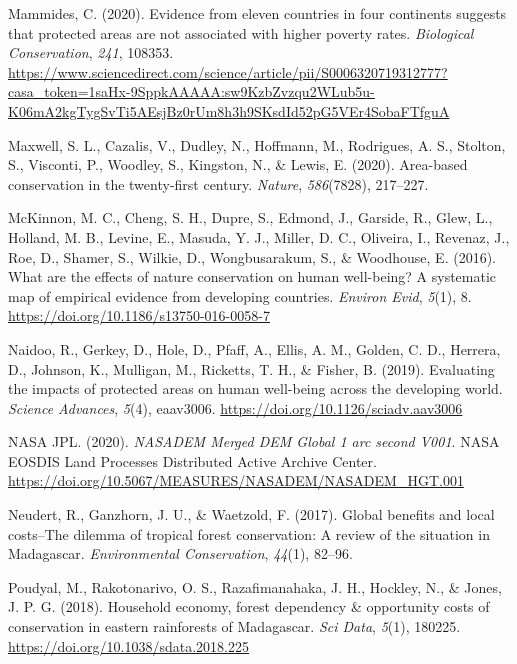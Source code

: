 \documentclass[
]{article}
\newlength{\cslhangindent}
\newenvironment{CSLReferences}[2] %
 {\begin{list}{}{%
  \setlength{\itemindent}{0pt}
  \setlength{\leftmargin}{0pt}
  \setlength{\parsep}{0pt}
  \ifodd #1
   \setlength{\leftmargin}{\cslhangindent}
   \setlength{\itemindent}{-1\cslhangindent}
  \fi
  \setlength{\itemsep}{#2\baselineskip}}}
 {\end{list}}
\begin{document}
\begin{CSLReferences}{1}{0}
Mammides, C. (2020). Evidence from eleven countries in four continents
suggests that protected areas are not associated with higher poverty
rates. \emph{Biological Conservation}, \emph{241}, 108353.
\url{https://www.sciencedirect.com/science/article/pii/S0006320719312777?casa_token=1saHx-9SppkAAAAA:sw9KzbZvzqu2WLub5u-K06mA2kgTygSvTi5AEsjBz0rUm8h3h9SKsdId52pG5VEr4SobaFTfguA}

Maxwell, S. L., Cazalis, V., Dudley, N., Hoffmann, M., Rodrigues, A. S.,
Stolton, S., Visconti, P., Woodley, S., Kingston, N., \& Lewis, E.
(2020). Area-based conservation in the twenty-first century.
\emph{Nature}, \emph{586}(7828), 217--227.

McKinnon, M. C., Cheng, S. H., Dupre, S., Edmond, J., Garside, R., Glew,
L., Holland, M. B., Levine, E., Masuda, Y. J., Miller, D. C., Oliveira,
I., Revenaz, J., Roe, D., Shamer, S., Wilkie, D., Wongbusarakum, S., \&
Woodhouse, E. (2016). What are the effects of nature conservation on
human well-being? {A} systematic map of empirical evidence from
developing countries. \emph{Environ Evid}, \emph{5}(1), 8.
\url{https://doi.org/10.1186/s13750-016-0058-7}

Naidoo, R., Gerkey, D., Hole, D., Pfaff, A., Ellis, A. M., Golden, C.
D., Herrera, D., Johnson, K., Mulligan, M., Ricketts, T. H., \& Fisher,
B. (2019). Evaluating the impacts of protected areas on human well-being
across the developing world. \emph{Science Advances}, \emph{5}(4),
eaav3006. \url{https://doi.org/10.1126/sciadv.aav3006}

NASA JPL. (2020). \emph{{NASADEM} {Merged} {DEM} {Global} 1 arc second
{V001}}. NASA EOSDIS Land Processes Distributed Active Archive Center.
\url{https://doi.org/10.5067/MEASURES/NASADEM/NASADEM_HGT.001}

Neudert, R., Ganzhorn, J. U., \& Waetzold, F. (2017). Global benefits
and local costs--{The} dilemma of tropical forest conservation: {A}
review of the situation in {Madagascar}. \emph{Environmental
Conservation}, \emph{44}(1), 82--96.

Poudyal, M., Rakotonarivo, O. S., Razafimanahaka, J. H., Hockley, N., \&
Jones, J. P. G. (2018). Household economy, forest dependency \&
opportunity costs of conservation in eastern rainforests of
{Madagascar}. \emph{Sci Data}, \emph{5}(1), 180225.
\url{https://doi.org/10.1038/sdata.2018.225}


\end{CSLReferences}
\end{document}
